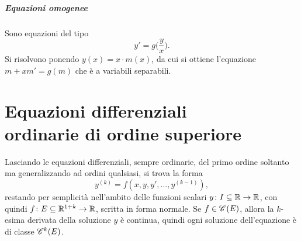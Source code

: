 \paragraph{Equazioni omogenee}
Sono equazioni del tipo
\begin{equation}
y'=g\Big(\frac{y}{x}\Big).
\end{equation}
Si risolvono ponendo $y(x)=x\cdot m(x)$, da cui si ottiene l'equazione $m+xm'=g(m)$ che è a variabili separabili.

\chapter[Equazioni differenziali ordinarie di ordine superiore]{Equazioni differenziali\\ordinarie di ordine superiore}
Lasciando le equazioni differenziali, sempre ordinarie, del primo ordine soltanto ma generalizzando ad ordini qualsiasi, si trova la forma
\begin{equation} \label{eq:diff-k}
y^{(k)}=f(x,y,y',\dots,y^{(k-1)}),
\end{equation}
restando per semplicità nell'ambito delle funzioni scalari $y\colon I\subseteq\R\to\R$, con quindi $f\colon E\subseteq\R^{1+k}\to\R$, scritta in forma normale.
Se $f\in\cont{E}$, allora la $k$-esima derivata della soluzione $y$ è continua, quindi ogni soluzione dell'equazione è di classe $\cont[k]{E}$.

